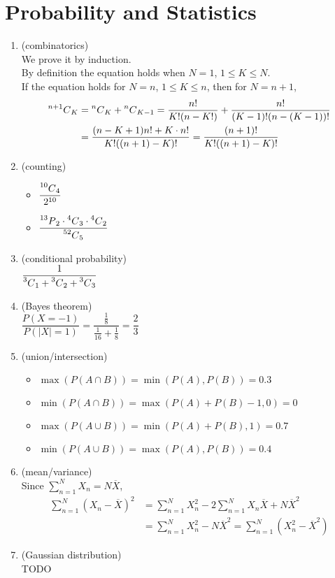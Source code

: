 \newcommand{\mlComb}[2]{\prescript{#1}{}{C}_{#2}}
\newcommand{\mlPerm}[2]{\prescript{#1}{}{P}_{#2}}

\section{Probability and Statistics}
\begin{enumerate}[(1)]
	\item (combinatorics) \\
		We prove it by induction. \\
		By definition the equation holds when $N=1$, $1\leq K \leq N$. \\
		If the equation holds for $N = n$, $1 \leq K \leq n$, then for $N = n+1$, \\
		\begin{align*}
			\mlComb{n+1}{K} &= \mlComb{n}{K} + \mlComb{n}{K-1} = \frac{n!}{K!(n-K!)} + \frac{n!}{(K-1)!(n-(K-1))!} \\
					&= \frac{(n-K+1)n! + K\cdot n!}{K!((n+1)-K)!} = \frac{(n+1)!}{K!((n+1)-K)!}
		\end{align*}
	\item (counting)
	\begin{itemize}
		\item $\dfrac{\mlComb{10}{4}}{2^{10}}$
		\item $\dfrac{\mlPerm{13}{2}\cdot \mlComb{4}{3}\cdot \mlComb{4}{2}}{\mlComb{52}{5}}$
	\end{itemize}
	\item (conditional probability) \\
		$\dfrac{1}{\mlComb{3}{1} + \mlComb{3}{2} + \mlComb{3}{3}}$
	\item (Bayes theorem) \\
		$\dfrac{P(X=-1)}{P(|X|=1)} = \dfrac{\frac{1}{8}}{\frac{1}{16} + \frac{1}{8}} = \dfrac{2}{3}$
	\item (union/intersection)
	\begin{itemize}
		\item $\max(P(A\cap B)) = \min(P(A), P(B)) = 0.3$
		\item $\min(P(A\cap B)) = \max(P(A) + P(B) - 1, 0) = 0$
		\item $\max(P(A\cup B)) = \min(P(A) + P(B), 1) = 0.7$
		\item $\min(P(A\cup B)) = \max(P(A), P(B)) = 0.4$
	\end{itemize}
	\item (mean/variance) \\
		Since $\sum^N_{n=1}X_n = N\overline{X}$,
		\begin{align*}
			\sum^N_{n=1}(X_n-\overline{X})^2 &= \sum^N_{n=1}X_n^2 - 2\sum^N_{n=1}X_n\overline{X} + N\overline{X}^2 \\
				&= \sum^N_{n=1}X_n^2 - N\overline{X}^2 = \sum^N_{n=1}(X_n^2 - \overline{X}^2)
		\end{align*}
	\item (Gaussian distribution) \\
		TODO
\end{enumerate}
